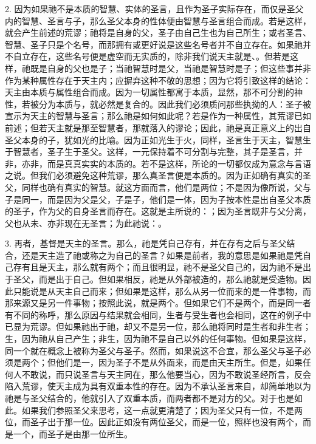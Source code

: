 2. 因为如果祂不是本质的智慧、实体的圣言，且作为圣子实际存在，而仅是圣父内的智慧、圣言与子，那么圣父本身的性体便由智慧与圣言组合而成。若是这样，就会产生前述的荒谬；祂将是自身的父，圣子由自己生也为自己所生；或者圣言、智慧、圣子只是个名号，而那拥有或更好说是这些名号者并不自立存在。如果祂并不自立存在，这些名号便是虚空而无实质的，除非我们说天主就是、。但若是这样，祂既是自身的父也是子；当祂智慧时是父，当祂是智慧时是子；但这些事并非作为某种属性存在于天主内；应摒弃这种不敬的思想；因为它将引致这样的结论：天主由本质与属性组合而成。因为一切属性都寓于本质，显然，那不可分割的神性，若被分为本质与，就必然是复合的。因此我们必须质问那些执拗的人：圣子被宣示为天主的智慧与圣言；那么祂是如何如此呢？若是作为一种属性，其荒谬已如前述；但若天主就是那至智慧者，那就落入的谬论；因此，祂是真正意义上的出自圣父本身的子，犹如光的比喻。因为正如光生于火，同样，圣言生于天主，智慧生于智慧者，圣子生于圣父。这样，一元保持着不可分割与完整，其子是圣言，并非，亦非，而是真真实实的本质的。若不是这样，所论的一切都仅成为意念与言语之说。但我们必须避免这种荒谬，那么真圣言便是本质的。因为正如确有真实的圣父，同样也确有真实的智慧。就这方面而言，他们是两位；不是因为像所说，父与子是同一，而是因为父是父，子是子，他们是一体，因为子按本性是出自圣父本质的圣子，作为父的自身圣言而存在。这就是主所说的：；因为圣言既非与父分离，父也从未、亦非现在无圣言；为此祂说：。\par

3. 再者，基督是天主的圣言。那么，祂是凭自己存有，并在存有之后与圣父结合，还是天主造了祂或称之为自己的圣言？如果是前者，我的意思是如果祂是凭自己存有且是天主，那么就有两个；而且很明显，祂不是圣父自己的，因为祂不是出于圣父，而是出于自己。但如果相反，祂是从外部被造的，那么祂就是受造物。因此只能说是从天主自己而来；但如果是这样，那么从另一位而来的是一件事物，而那来源又是另一件事物；按照此说，就是两个。但如果它们不是两个，而是同一者有不同的称呼，那么原因与结果就会相同，生者与受生者也会相同，这在的例子中已显为荒谬。但如果祂出于祂，却又不是另一位，那么祂将同时是生者和非生者；生，因为祂从自己产生；非生，因为祂不是自己以外的任何事物。但如果是这样，同一个就在概念上被称为圣父与圣子。然而，如果说这不合宜，那么圣父与圣子必须是两个；但他们是一，因为圣子不是从外面来，而是由天主所生。但是，如果任何人不敢说，而只说圣言与天主同在，那么他要当心，因为不敢说圣经所言，反会陷入荒谬，使天主成为具有双重本性的存在。因为不承认圣言来自，却简单地以为祂是与圣父结合的，他就引入了双重本质，而两者都不是对方的父。对于也是如此。如果我们参照圣父来思考，这一点就更清楚了；因为圣父只有一位，不是两位，而圣子出于那一位。因此正如没有两位圣父，而是一位，照样也没有两个，而是一个，而圣子是由那一位所生。\par

